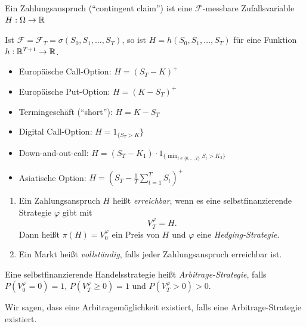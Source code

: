 \documentclass[a4paper,twoside,DIV15,BCOR12mm]{scrbook}
\newcommand{\cF}{\mathcal F}
\begin{document}
\begin{definition}
Ein Zahlungsanspruch (“contingent claim”) ist eine $\cF$-messbare Zufallsvariable $H:\Omega\to \mathbb{R}$
\end{definition}

\begin{bemerkung}
Ist $\cF = \cF_T = \sigma(S_0,S_1,\ldots,S_T)$, so ist $H = h(S_0,S_1,\ldots,S_T)$ für eine Funktion $h:\mathbb{R}^{T+1} \to \mathbb{R}$.
\end{bemerkung}

\begin{beispiel}
\begin{itemize}
\item Europäische Call-Option: $H=(S_T-K)^+$
\item Europäische Put-Option: $H=(K-S_T)^+$
\item Termingeschäft (“short”): $H=K-S_T$
\item Digital Call-Option: $H = 1_{\{S_T > K}\}$
\item Down-and-out-call: $H = (S_T-K_1) \cdot 1_{\{\min_{t\in\{0,\ldots,T\}} S_t > K_2\}}$
\item Asiatische Option: $H = (S_T - \frac1T \sum_{t=1}^T S_t)^+$
\end{itemize}
\end{beispiel}

\begin{definition}
\begin{enumerate}
\item Ein Zahlungsanspruch $H$ heißt \emph{erreichbar}, wenn es eine selbstfinanzierende Strategie $\varphi$ gibt mit
\[
V_T^\varphi = H.
\]
Dann heißt $\pi(H) = V_0^\varphi$ ein Preis von $H$ und $\varphi$ eine \emph{Hedging-Strategie}.
\item Ein Markt heißt \emph{vollständig},  falls jeder Zahlungsanspruch erreichbar ist.
\end{enumerate}
\end{definition}

\begin{definition}
Eine selbstfinanzierende Handelsstrategie heißt \emph{Arbitrage-Strategie},  falls $P(V_0^\varphi = 0)=1$, $P(V_T^\varphi \ge 0) = 1$ und $P(V_T^\varphi>0) >0$.

Wir sagen, dass eine Arbitragemöglichkeit existiert, falls eine Arbitrage-Strategie existiert.
\end{definition}
\end{document}
